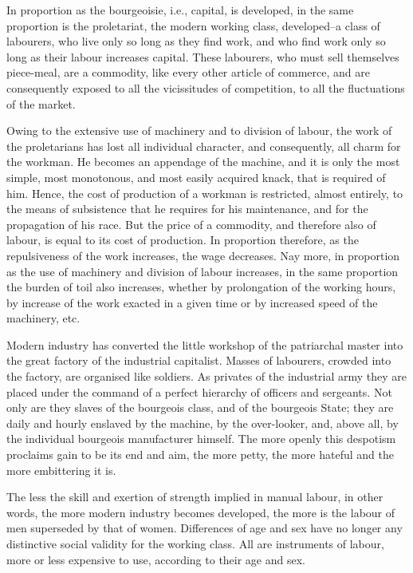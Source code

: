 \documentclass[11pt]{book}
\begin{document}
In proportion as the bourgeoisie, i.e., capital, is developed,
in the same proportion is the proletariat, the modern working
class, developed--a class of labourers, who live only so long
as they find work, and who find work only so long as their labour
increases capital.  These labourers, who must sell themselves
piece-meal, are a commodity, like every other article of
commerce, and are consequently exposed to all the vicissitudes of
competition, to all the fluctuations of the market.

Owing to the extensive use of machinery and to division of
labour, the work of the proletarians has lost all individual
character, and consequently, all charm for the workman.  He
becomes an appendage of the machine, and it is only the most
simple, most monotonous, and most easily acquired knack, that is
required of him.  Hence, the cost of production of a workman is
restricted, almost entirely, to the means of subsistence that he
requires for his maintenance, and for the propagation of his
race.  But the price of a commodity, and therefore also of
labour, is equal to its cost of production.  In proportion
therefore, as the repulsiveness of the work increases, the wage
decreases.  Nay more, in proportion as the use of machinery and
division of labour increases, in the same proportion the burden
of toil also increases, whether by prolongation of the working
hours, by increase of the work exacted in a given time or by
increased speed of the machinery, etc.

Modern industry has converted the little workshop of the
patriarchal master into the great factory of the industrial
capitalist.  Masses of labourers, crowded into the factory, are
organised like soldiers.  As privates of the industrial army they
are placed under the command of a perfect hierarchy of officers
and sergeants.  Not only are they slaves of the bourgeois class,
and of the bourgeois State; they are daily and hourly enslaved by
the machine, by the over-looker, and, above all, by the
individual bourgeois manufacturer himself.  The more openly this
despotism proclaims gain to be its end and aim, the more petty,
the more hateful and the more embittering it is.

The less the skill and exertion of strength implied in manual
labour, in other words, the more modern industry becomes
developed, the more is the labour of men superseded by that of
women. Differences of age and sex have no longer any distinctive
social validity for the working class. All are instruments of
labour, more or less expensive to use, according to their age
and sex.
\end{document}
